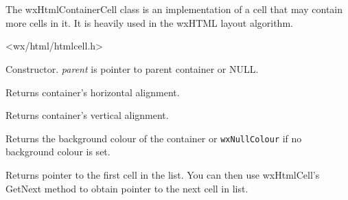%
%

\section{}\label{wxhtmlcontainercell}

The wxHtmlContainerCell class is an implementation of a cell that may
contain more cells in it. It is heavily used in the wxHTML layout algorithm.




<wx/html/htmlcell.h>




\label{wxhtmlcontainercellwxhtmlcontainercell}


Constructor. {\it parent} is pointer to parent container or NULL.


\label{wxhtmlcontainercellgetalignhor}


Returns container's horizontal alignment.

\label{wxhtmlcontainercellgetalignver}


Returns container's vertical alignment.

\label{wxhtmlcontainercellgetbackgroundcolour}


Returns the background colour of the container or {\tt wxNullColour} if no background
colour is set.

\label{wxhtmlcontainercellgetfirstcell}


Returns pointer to the first cell in the list.
You can then use wxHtmlCell's GetNext method to obtain pointer to the next
cell in list.

